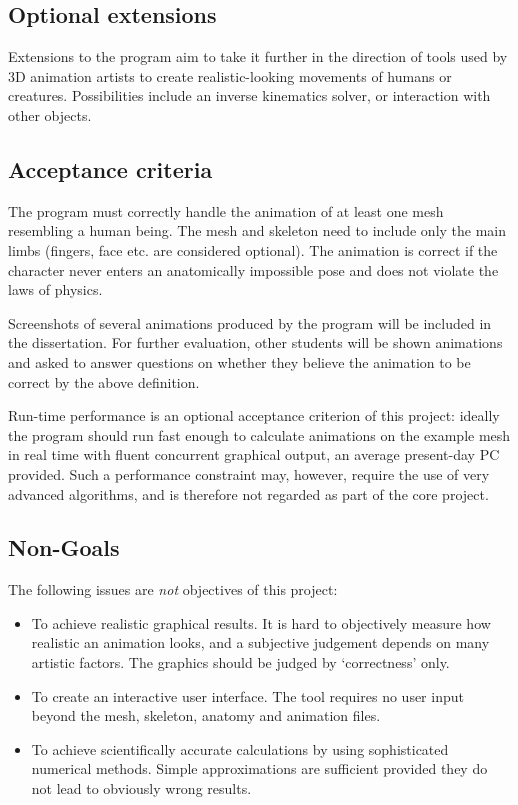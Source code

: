 \subsection*{Optional extensions}

Extensions to the program aim to take it further in the direction of
tools used by 3D animation artists to create realistic-looking
movements of humans or creatures. Possibilities include an inverse
kinematics solver, or interaction with other objects.


\subsection*{Acceptance criteria}

The program must correctly handle the animation of at least one mesh
resembling a human being. The mesh and skeleton need to include only
the main limbs (fingers, face etc. are considered optional). The
animation is correct if the character never enters an anatomically
impossible pose and does not violate the laws of physics.

Screenshots of several animations produced by the program will be
included in the dissertation. For further evaluation, other students
will be shown animations and asked to answer questions on whether they
believe the animation to be correct by the above definition.

Run-time performance is an optional acceptance criterion of this
project: ideally the program should run fast enough to calculate
animations on the example mesh in real time with fluent concurrent
graphical output, an average present-day PC provided. Such a
performance constraint may, however, require the use of very advanced
algorithms, and is therefore not regarded as part of the core project.


\subsection*{Non-Goals}

The following issues are \emph{not} objectives of this project:

\begin{itemize}
\item To achieve realistic graphical results. It is hard to objectively
  measure how realistic an animation looks, and a subjective judgement
  depends on many artistic factors. The graphics should be judged by
  `correctness' only.

\item To create an interactive user interface. The tool requires no user
  input beyond the mesh, skeleton, anatomy and animation files.

\item To achieve scientifically accurate calculations by using
  sophisticated numerical methods. Simple approximations are
  sufficient provided they do not lead to obviously wrong results.
\end{itemize}


